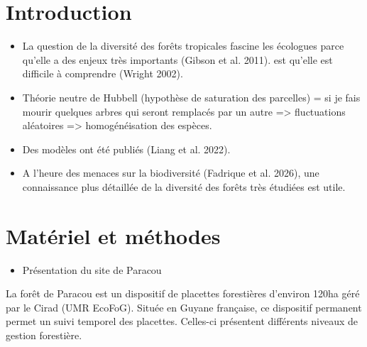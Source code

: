\documentclass[
  french,
  11pt,
]{stylisharticle}
\affiliation{%
      \textsuperscript{1}%
      Dummy Organization%
      , Scientific Department%
      , Somewhere%
      , City%
      , Country%
      , 9999%
    }
\providecommand{\tightlist}{%
  \setlength{\itemsep}{0pt}\setlength{\parskip}{0pt}}
\begin{document}
\flushbottom

\maketitle

\tableofcontents

\thispagestyle{empty}

\section{Introduction}\label{introduction}

\begin{itemize}
\item
  La question de la diversité des forêts tropicales fascine les
  écologues parce qu'elle a des enjeux très importants ({Gibson et al.}
  2011). est qu'elle est difficile à comprendre (Wright 2002).
\item
  Théorie neutre de Hubbell (hypothèse de saturation des parcelles) = si
  je fais mourir quelques arbres qui seront remplacés par un autre
  =\textgreater{} fluctuations aléatoires =\textgreater{}
  homogénéisation des espèces.
\item
  Des modèles ont été publiés ({Liang et al.} 2022).
\item
  A l'heure des menaces sur la biodiversité ({Fadrique et al.} 2026),
  une connaissance plus détaillée de la diversité des forêts très
  étudiées est utile.
\end{itemize}

\section{Matériel et méthodes}\label{matuxe9riel-et-muxe9thodes}

\begin{itemize}
\tightlist
\item
  Présentation du site de Paracou
\end{itemize}

\scriptsize

\normalsize

La forêt de Paracou est un dispositif de placettes forestières d'environ
120ha géré par le Cirad (UMR EcoFoG). Située en Guyane française, ce
dispositif permanent permet un suivi temporel des placettes. Celles-ci
présentent différents niveaux de gestion forestière.
\end{document}
